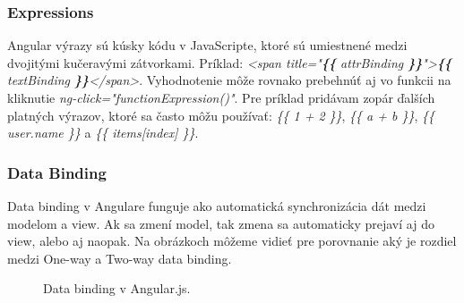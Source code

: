 \subsubsection{Expressions}
Angular výrazy sú kúsky kódu v JavaScripte, ktoré sú umiestnené medzi dvojitými kučeravými zátvorkami. Príklad: \textit{<span title="\textbf{\{\{} attrBinding \textbf{\}\}}">\textbf{\{\{} textBinding \textbf{\}\}}</span>}. Vyhodnotenie môže rovnako prebehnúť aj vo funkcii na kliknutie \textit{ng-click="functionExpression()"}.
Pre príklad pridávam zopár ďalších platných výrazov, ktoré sa často môžu používať: \textit{\{\{ 1 + 2 \}\}}, \textit{\{\{ a + b \}\}}, \textit{\{\{ user.name \}\}} a 
\textit{\{\{ items[index] \}\}}.\cite{angular-docs}




\subsubsection{Data Binding}
Data binding v Angulare funguje ako automatická synchronizácia dát medzi modelom a view. Ak sa zmení model, tak zmena sa automaticky prejaví aj do view, alebo aj naopak.
Na obrázkoch môžeme vidieť pre porovnanie aký je rozdiel medzi One-way a Two-way data binding.

\begin{figure}[H]
\caption{Data binding v Angular.js.}
\end{figure}

